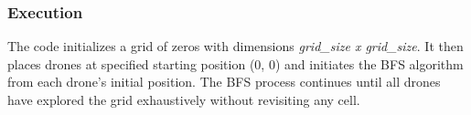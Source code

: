 \subsubsection{Execution}

The code initializes a grid of zeros with dimensions \textit{grid\_size x grid\_size}. It then places drones at specified starting position (0, 0) and initiates the BFS algorithm from each drone's initial position. The BFS process continues until all drones have explored the grid exhaustively without revisiting any cell.

